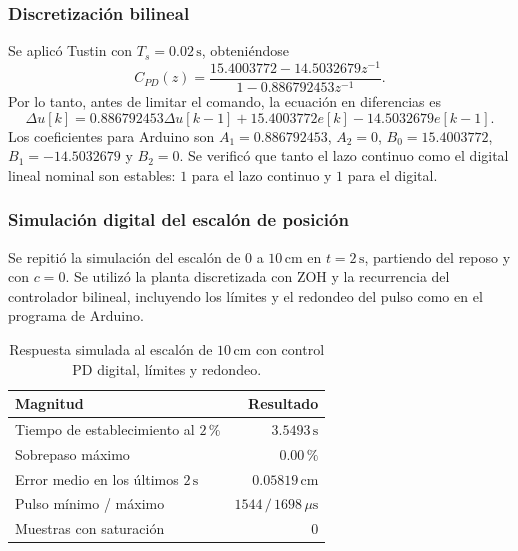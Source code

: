 \documentclass[a4paper, twoside, 10pt, spanish]{article}
\numberwithin{table}{section}
\begin{document}
    \subsubsection{Discretización bilineal}
    Se aplicó Tustin con $T_s=0.02\,\text{s}$, obteniéndose
    \begin{equation}
        C_{PD}(z)=\frac{15.4003772-14.5032679z^{-1}}
        {1-0.886792453z^{-1}}.
        \label{eq:pd_discreto}
    \end{equation}
    Por lo tanto, antes de limitar el comando, la ecuación en diferencias es
    \[
        \Delta u[k]=0.886792453\Delta u[k-1]
        +15.4003772e[k]-14.5032679e[k-1].
    \]
    Los coeficientes para Arduino son $A_1=0.886792453$, $A_2=0$, $B_0=15.4003772$, $B_1=-14.5032679$ y $B_2=0$. Se verificó que tanto el lazo continuo como el digital lineal nominal son estables: $1$ para el lazo continuo y $1$ para el digital.

    \subsubsection{Simulación digital del escalón de posición}
    Se repitió la simulación del escalón de $0$ a $10\,\text{cm}$ en $t=2\,\text{s}$, partiendo del reposo y con $c=0$. Se utilizó la planta discretizada con ZOH y la recurrencia del controlador bilineal, incluyendo los límites y el redondeo del pulso como en el programa de Arduino.

    \begin{table}[H]
        \centering
        \caption{Respuesta simulada al escalón de $10\,\text{cm}$ con control PD digital, límites y redondeo.}
        \label{tab:pd_escalon_simulado}
        \begin{tabular}{lr}
            \toprule
            Magnitud & Resultado \\
            \midrule
            Tiempo de establecimiento al $2\,\%$ & $3.5493\,\text{s}$ \\
            Sobrepaso máximo & $0.00\,\%$ \\
            Error medio en los últimos $2\,\text{s}$ & $0.05819\,\text{cm}$ \\
            Pulso mínimo / máximo & $1544\,/\,1698\,\mu\text{s}$ \\
            Muestras con saturación & $0$ \\
            \bottomrule
        \end{tabular}
    \end{table}
\end{document}
